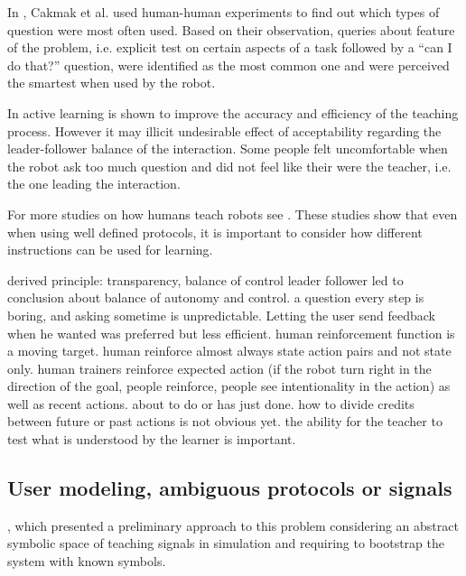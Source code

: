 In \cite{cakmak2012designing}, Cakmak et al. used human-human experiments to find out which types of question were most often used. Based on their observation, queries about feature of the problem, i.e. explicit test on certain aspects of a task followed by a ``can I do that?'' question, were identified as the most common one and were perceived the smartest when used by the robot. 

In \cite{chao2010transparent} active learning is shown to improve the accuracy and efficiency of the teaching process. However it may illicit undesirable effect of acceptability regarding the leader-follower balance of the interaction. Some people felt uncomfortable when the robot ask too much question and did not feel like their were the teacher, i.e. the one leading the interaction.


For more studies on how humans teach robots see \cite{thomaz2009learning,kaochar2011towards,knox2012humans}. These studies show that even when using well defined protocols, it is important to consider how different instructions can be used for learning. 

derived principle: \cite{thomaz2008teachable} 
transparency, balance of control leader follower
\cite{cakmak2010designing} led to conclusion about balance of autonomy and control. a question every step is boring,  and asking sometime is unpredictable. Letting the user send feedback when he wanted was preferred but less efficient.
\cite{knox2009design} human reinforcement function is a moving target. human reinforce almost always state action pairs and not state only. human trainers reinforce expected action (if the robot turn right in the direction of the goal, people reinforce, people see intentionality in the action) as well as recent actions. about to do or has just done. how to divide credits between future or past actions is not obvious yet.
\cite{kaochar2011towards} the ability for the teacher to test what is understood by the learner is important.

\subsection{User modeling, ambiguous protocols or signals}

\cite{macl11simul}, which presented a preliminary approach to this problem considering an abstract symbolic space of teaching signals in simulation and requiring to bootstrap the system with known symbols.

